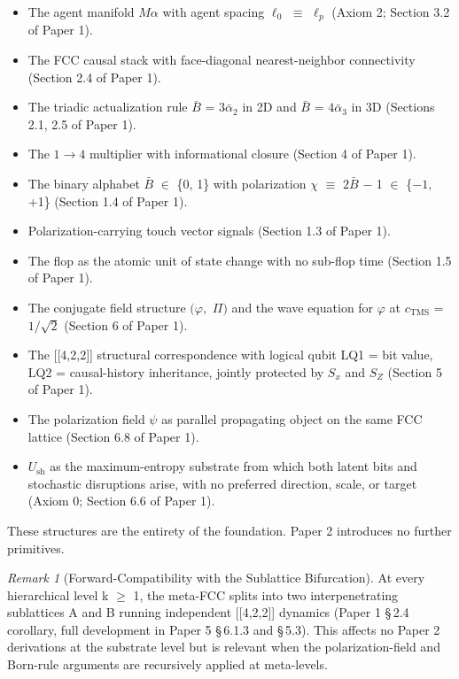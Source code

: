\documentclass[11pt,oneside]{report}
\theoremstyle{definition}
\theoremstyle{remark}
\newtheorem{remark}[theorem]{Remark}
\begin{document}
\begin{itemize}
\item
  The agent manifold \ensuremath{M\alpha} with agent spacing \ensuremath{\ell_{0}} \ensuremath{\equiv} \ensuremath{\ell_{p}} (Axiom 2; Section 3.2
  of Paper 1).
\item
  The FCC causal stack with face-diagonal nearest-neighbor connectivity
  (Section 2.4 of Paper 1).
\item
  The triadic actualization rule \ensuremath{\bar{B}} = \ensuremath{3\bar{\alpha}_{2}} in 2D and \ensuremath{\bar{B}} = \ensuremath{4\bar{\alpha}_{3}} in 3D
  (Sections 2.1, 2.5 of Paper 1).
\item
  The \ensuremath{1\to 4} multiplier with informational closure (Section 4 of Paper 1).
\item
  The binary alphabet \ensuremath{\bar{B}} \ensuremath{\in} \{0, 1\} with polarization \ensuremath{\chi} \ensuremath{\equiv} \ensuremath{2\bar{B}} \ensuremath{-} 1 \ensuremath{\in} \{\ensuremath{-1,}
  +1\} (Section 1.4 of Paper 1).
\item
  Polarization-carrying touch vector signals (Section 1.3 of Paper 1).
\item
  The flop as the atomic unit of state change with no sub-flop time
  (Section 1.5 of Paper 1).
\item
  The conjugate field structure \ensuremath{(\varphi ,} \ensuremath{\Pi )} and the wave equation for \ensuremath{\varphi} at
  \ensuremath{c_{\mathrm{TMS}}} = \ensuremath{1/\sqrt{2}} (Section 6 of Paper 1).
\item
  The [[4,2,2]] structural correspondence with logical qubit LQ1
  = bit value, LQ2 = causal-history inheritance, jointly protected by \ensuremath{S_{x}}
  and \ensuremath{S_{Z}} (Section 5 of Paper 1).
\item
  The polarization field \ensuremath{\psi} as parallel propagating object on the same
  FCC lattice (Section 6.8 of Paper 1).
\item
  \ensuremath{U_{\mathrm{sh}}} as the maximum-entropy substrate from which both latent bits and
  stochastic disruptions arise, with no preferred direction, scale, or
  target (Axiom 0; Section 6.6 of Paper 1).
\end{itemize}

These structures are the entirety of the foundation. Paper 2 introduces
no further primitives.

\begin{remark}[Forward-Compatibility with the Sublattice Bifurcation]
At every
hierarchical level k \ensuremath{\geq} 1, the meta-FCC splits into two interpenetrating
sublattices A and B running independent [[4,2,2]] dynamics
(Paper 1 \S\,2.4 corollary, full development in Paper 5 \S\,6.1.3 and \S\,5.3).
This affects no Paper 2 derivations at the substrate level but is
relevant when the polarization-field and Born-rule arguments are
recursively applied at meta-levels.
\end{remark}
\end{document}
